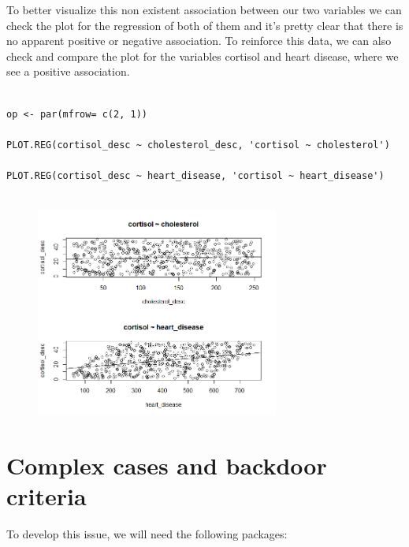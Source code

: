 \documentclass{article}
\begin{document}
To better visualize this non existent association between our two variables we can check the plot for the regression of both of them and it's pretty clear that there is no apparent positive or negative association. To reinforce this data, we can also check and compare the plot for the variables cortisol and heart disease, where we see a positive association.

\begin{lstlisting}

op <- par(mfrow= c(2, 1))

PLOT.REG(cortisol_desc ~ cholesterol_desc, 'cortisol ~ cholesterol')

PLOT.REG(cortisol_desc ~ heart_disease, 'cortisol ~ heart_disease')


\end{lstlisting}


\begin{figure}[h]
\includegraphics[width=8cm]{PLOT_CR_CH_HD.png}
\centering
\end{figure}
\newpage

\section{Complex cases and backdoor criteria}

To develop this issue, we will need the following packages:
\end{document}
